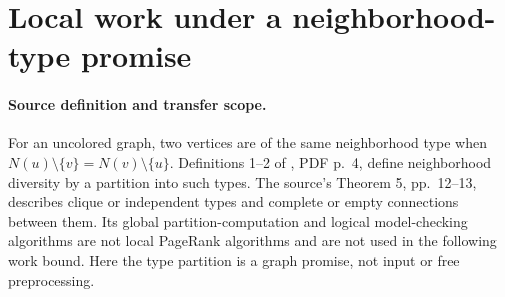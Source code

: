 \section{Local work under a neighborhood-type promise}
\label{sec:op3-neighborhood-types}

\paragraph{Source definition and transfer scope.}
For an uncolored graph, two vertices are of the same neighborhood type
when $N(u)\setminus\{v\}=N(v)\setminus\{u\}$.
Definitions 1--2 of \citet{lampis2009types}, PDF p.\ 4, define neighborhood
diversity by a partition into such types. The source's Theorem 5,
pp.\ 12--13, describes clique or independent types and complete or empty
connections between them. Its global partition-computation and logical
model-checking algorithms are not local PageRank algorithms and are not
used in the following work bound. Here the type partition is a graph
promise, not input or free preprocessing.


